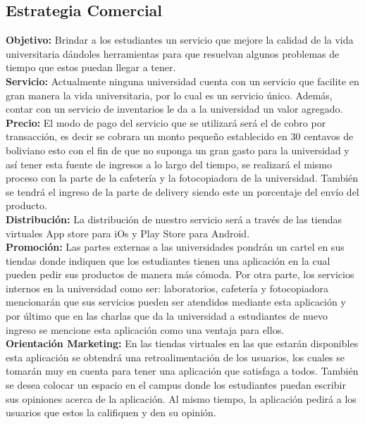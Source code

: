 \documentclass[11pt]{article}
\begin{document}
    \subsection{Estrategia Comercial} 
    
    \textbf{Objetivo:} Brindar a los estudiantes un servicio que mejore la calidad de la vida universitaria dándoles herramientas para que resuelvan algunos problemas de tiempo que estos puedan llegar a tener.\\
    
    \textbf{Servicio:} Actualmente ninguna universidad cuenta con un servicio que facilite en gran manera la vida universitaria, por lo cual es un servicio único. Además, contar con un servicio de inventarios le da a la universidad
    un valor agregado.\\
    
    \textbf{Precio:} El modo de pago del servicio que se utilizar\'a ser\'a el de cobro por transacción, es decir se cobrara un monto pequeño establecido en 30 centavos de boliviano esto con el fin de que no suponga un gran gasto  para la universidad y así tener esta fuente de ingresos a lo largo del tiempo, se realizar\'a el mismo proceso con la parte de la cafeter\'ia y la fotocopiadora de la universidad. También se tendrá el ingreso de la parte de delivery siendo este un porcentaje del envío del producto.  \\
    
    \textbf{Distribución:} La distribución de nuestro servicio será a través de las tiendas virtuales App store para iOs y Play Store para Android.\\
    
    \textbf{Promoción:} Las partes externas a las universidades pondrán un cartel en sus tiendas donde indiquen que los estudiantes tienen una aplicación en la cual pueden pedir sus productos de manera más cómoda. Por otra parte, los servicios internos en la universidad como ser: laboratorios, cafetería y fotocopiadora mencionarán que sus servicios pueden ser atendidos mediante esta aplicación y por último que en las charlas que da la universidad a estudiantes de nuevo ingreso se mencione esta aplicación como una ventaja para ellos.\\
    
    
    \textbf{Orientación Marketing:} En las tiendas virtuales en las que estarán disponibles esta aplicación se obtendrá una retroalimentación de los usuarios, los cuales se tomarán muy en cuenta para tener una aplicación que satisfaga a todos. También se desea colocar un espacio en el campus donde los estudiantes puedan escribir sus opiniones acerca de la aplicación. Al mismo tiempo, la aplicación pedirá a los usuarios que estos la califiquen y den su opinión.
\end{document}
